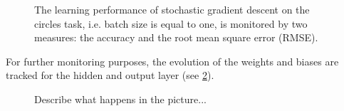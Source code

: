 \begin{figure}
	\label{circles_acc}
	\begin{center}
		
	\end{center}
	\caption{The learning performance of stochastic gradient descent on the circles task, i.e. batch size is equal to one, is monitored by two measures: the accuracy and the root mean square error (RMSE).}
\end{figure}

For further monitoring purposes, the evolution of the weights and biases are tracked for the hidden and output layer (see \cref{network_monitoring}).
\begin{figure}
	\centering
	\label{network_monitoring}
    
	\caption{Describe what happens in the picture...}
\end{figure}
